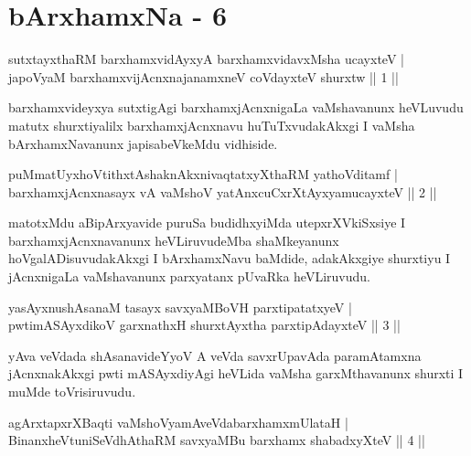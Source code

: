 \chapter{bArxhamxNa - 6}

\begin{shl}
sutxtayxthaRM barxhamxvidAyxyA barxhamxvidavxMsha ucayxteV |\\
japoV\s yaM barxhamxvijAcnxnajanamxneV coVdayxteV shurxtw \hfill || 1 ||
\end{shl}

\begin{artha}
barxhamxvideyxya sutxtigAgi barxhamxjAcnxnigaLa vaMshavanunx heVLuvudu matutx shurxtiyalilx barxhamxjAcnxnavu huTuTxvudakAkxgi I vaMsha bArxhamxNavanunx japisabeVkeMdu vidhiside.
\end{artha}

\begin{shl}
puMmatUyxhoVtithxtAshaknAkxnivaqtatxyXthaRM yathoVditamf |\\
barxhamxjAcnxnasayx vA vaMshoV yatAnxcuCxrXtAyx\s yamucayxteV \hfill || 2 ||
\end{shl}

\begin{artha}
matotxMdu aBipArxyavide puruSa budidhxyiMda utepxrXVkiSxsiye I barxhamxjAcnxnavanunx heVLiruvudeMba shaMkeyanunx hoVgalADisuvudakAkxgi I bArxhamxNavu baMdide, adakAkxgiye shurxtiyu I jAcnxnigaLa vaMshavanunx parxyatanx pUvaRka heVLiruvudu.
\end{artha}


\begin{shl}
yasAyxnushAsanaM tasayx savxyaMBoVH parxtipatatxyeV |\\
pwtimASAyxdikoV garxnathxH shurxtAyx\s tha parxtipAdayxteV \hfill || 3 ||
\end{shl}

\begin{artha}
yAva veVdada shAsanavideYyoV A veVda savxrUpavAda paramAtamxna jAcnxnakAkxgi pwti mASAyxdiyAgi heVLida vaMsha garxMthavanunx shurxti I muMde toVrisiruvudu.
\end{artha}

\begin{shl}
agArxtapxrXBaqti vaMshoV\s yamAveVdabarxhamxmUlataH |\\
BinanxheVtuniSeVdhAthaRM savxyaMBu barxhamx shabadxyXteV \hfill || 4 ||
\end{shl}

